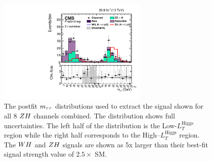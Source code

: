 

\begin{figure}[h!]
 \begin{center}
  \includegraphics[width=0.65\textwidth]{higgs_to_taus_vh/plots/zh/zh_postfit.pdf}
 \end{center}
 \caption{The postfit $m_{\tau\tau}$ distributions used to extract the signal shown
  for all 8 $ZH$ channels combined.
  The distribution shows full uncertainties.
  The left half of the distribution is the Low-$L_{T}^{\textrm{Higgs}}$ region
  while the right half corresponds to the High--$L_{T}^{\textrm{Higgs}}$ region.
  The $WH$ and $ZH$ signals are shown as 5x larger than their best-fit
  signal strength value of $2.5 \times$ SM.
 }
 \label{fig:zh_results_svFitAll}
\end{figure}

